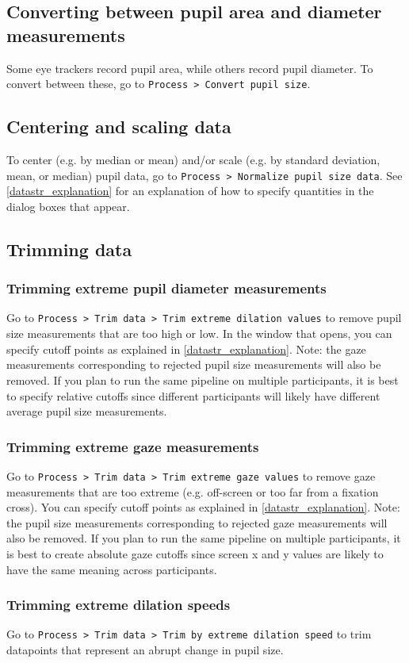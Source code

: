 \documentclass{article}
\begin{document}
\subsection{Converting between pupil area and diameter measurements}
Some eye trackers record pupil area, while others record pupil diameter. To convert between these, go to \texttt{Process > Convert pupil size}.
\subsection{Centering and scaling data}
To center (e.g. by median or mean) and/or scale (e.g. by standard deviation, mean, or median) pupil data, go to \texttt{Process > Normalize pupil size data}. See \ref{datastr_explanation} for an explanation of how to specify quantities in the dialog boxes that appear.
\subsection{Trimming data}
\subsubsection{Trimming extreme pupil diameter measurements}
Go to \texttt{Process > Trim data > Trim extreme dilation values} to remove pupil size measurements that are too high or low. In the window that opens, you can specify cutoff points as explained in \ref{datastr_explanation}. Note: the gaze measurements corresponding to rejected pupil size measurements will also be removed. If you plan to run the same pipeline on multiple participants, it is best to specify relative cutoffs since different participants will likely have different average pupil size measurements.
\subsubsection{Trimming extreme gaze measurements}
Go to \texttt{Process > Trim data > Trim extreme gaze values} to remove gaze measurements that are too extreme (e.g. off-screen or too far from a fixation cross). You can specify cutoff points as explained in \ref{datastr_explanation}. Note: the pupil size measurements corresponding to rejected gaze measurements will also be removed. If you plan to run the same pipeline on multiple participants, it is best to create absolute gaze cutoffs since screen x and y values are likely to have the same meaning across participants.
\subsubsection{Trimming extreme dilation speeds}
Go to \texttt{Process > Trim data > Trim by extreme dilation speed} to trim datapoints that represent an abrupt change in pupil size.
\end{document}
